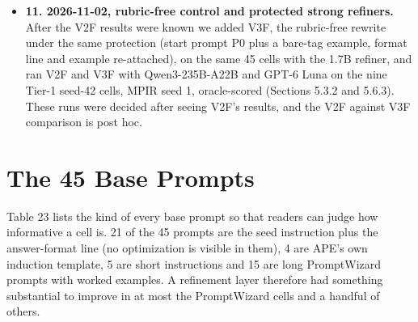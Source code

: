 \documentclass{ieeeaccess}
\begin{document}
\begin{itemize}
\item \textbf{11. 2026-11-02, rubric-free control and protected strong refiners.} After the V2F results were known we added V3F, the rubric-free rewrite under the same protection (start prompt P0 plus a bare-tag example, format line and example re-attached), on the same 45 cells with the 1.7B refiner, and ran V2F and V3F with Qwen3-235B-A22B and GPT-6 Luna on the nine Tier-1 seed-42 cells, MPIR seed 1, oracle-scored (Sections 5.3.2 and 5.6.3). These runs were decided after seeing V2F's results, and the V2F against V3F comparison is post hoc.
\end{itemize}

\section{The 45 Base Prompts}

Table 23 lists the kind of every base prompt so that readers can judge how informative a cell is. 21 of the 45 prompts are the seed instruction plus the answer-format line (no optimization is visible in them), 4 are APE's own induction template, 5 are short instructions and 15 are long PromptWizard prompts with worked examples. A refinement layer therefore had something substantial to improve in at most the PromptWizard cells and a handful of others.
\end{document}

